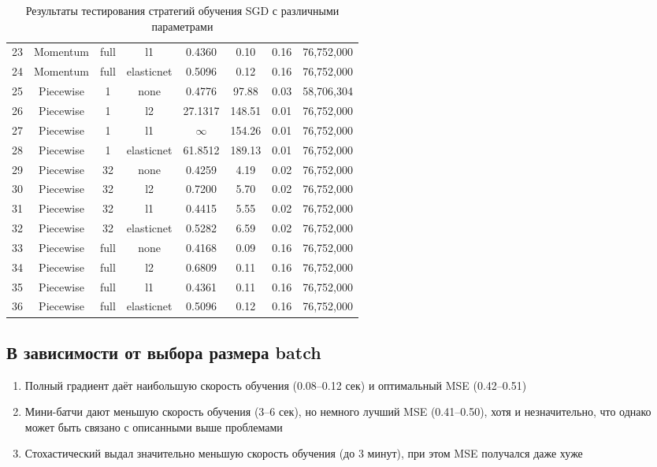 \documentclass{article}
\begin{document}
\begin{table}[htbp]
\begin{tabular}{|c|c|c|c|c|c|c|c|}
23 & Momentum & full & l1 & 0.4360 & 0.10 & 0.16 & 76,752,000 \\
24 & Momentum & full & elasticnet & 0.5096 & 0.12 & 0.16 & 76,752,000 \\
\hline
25 & Piecewise & 1 & none & 0.4776 & 97.88 & 0.03 & 58,706,304 \\
26 & Piecewise & 1 & l2 & 27.1317 & 148.51 & 0.01 & 76,752,000 \\
27 & Piecewise & 1 & l1 & $\infty$ & 154.26 & 0.01 & 76,752,000 \\
28 & Piecewise & 1 & elasticnet & 61.8512 & 189.13 & 0.01 & 76,752,000 \\
29 & Piecewise & 32 & none & 0.4259 & 4.19 & 0.02 & 76,752,000 \\
30 & Piecewise & 32 & l2 & 0.7200 & 5.70 & 0.02 & 76,752,000 \\
31 & Piecewise & 32 & l1 & 0.4415 & 5.55 & 0.02 & 76,752,000 \\
32 & Piecewise & 32 & elasticnet & 0.5282 & 6.59 & 0.02 & 76,752,000 \\
33 & Piecewise & full & none & 0.4168 & 0.09 & 0.16 & 76,752,000 \\
34 & Piecewise & full & l2 & 0.6809 & 0.11 & 0.16 & 76,752,000 \\
35 & Piecewise & full & l1 & 0.4361 & 0.11 & 0.16 & 76,752,000 \\
36 & Piecewise & full & elasticnet & 0.5096 & 0.12 & 0.16 & 76,752,000 \\
\hline
\end{tabular}
\caption{Результаты тестирования стратегий обучения SGD с различными параметрами}
\end{table}

\subsection{В зависимости от выбора размера batch}
\begin{enumerate}
    \item 
    Полный градиент даёт наибольшую скорость обучения (0.08–0.12 сек) и оптимальный MSE (0.42–0.51)
    \item
    Мини-батчи дают меньшую скорость обучения (3–6 сек), но немного лучший MSE (0.41–0.50), хотя и незначительно, что однако может быть связано с описанными выше проблемами
    \item
    Стохастический выдал значительно меньшую скорость обучения (до 3 минут), при этом MSE получался даже хуже
\end{enumerate}
\end{document}
